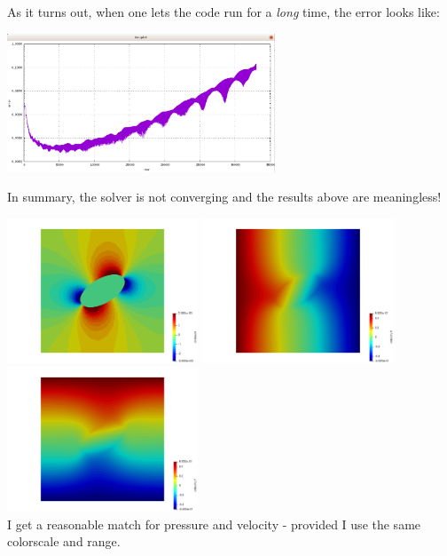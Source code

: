 As it turns out, when one lets the code run for a {\it long} time, 
the error looks like:
\begin{center}
\includegraphics[width=8cm]{python_codes/fieldstone_142/results/case2/error}
\end{center}
In summary, {\color{red} the solver is not converging} and the results above are meaningless!


\begin{center}
\includegraphics[width=5.7cm]{python_codes/fieldstone_142/results/case2/press2}
\includegraphics[width=5.7cm]{python_codes/fieldstone_142/results/case2/u2}
\includegraphics[width=5.7cm]{python_codes/fieldstone_142/results/case2/v2}\\
{\captionfont I get a reasonable match for pressure and velocity - provided I use 
the same colorscale and range.}
\end{center}

